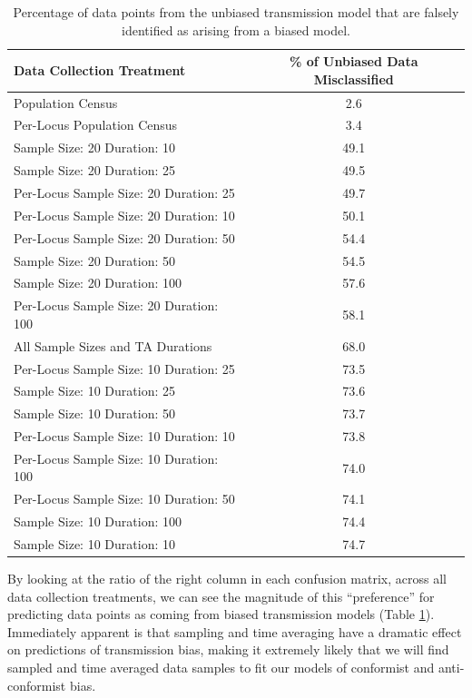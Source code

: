 \documentclass[10pt,letterpaper]{article}
\begin{document}
\begin{table}[ht]

\begin{tabular}{|l|c|}
  \hline
Data Collection Treatment & \% of Unbiased Data Misclassified \\
  \hline
Population Census & 2.6 \\
  Per-Locus Population Census & 3.4 \\
  Sample Size:  20  Duration:  10 & 49.1 \\
  Sample Size:  20  Duration:  25 & 49.5 \\
  Per-Locus Sample Size:  20  Duration:  25 & 49.7 \\
  Per-Locus Sample Size:  20  Duration:  10 & 50.1 \\
  Per-Locus Sample Size:  20  Duration:  50 & 54.4 \\
  Sample Size:  20  Duration:  50 & 54.5 \\
  Sample Size:  20  Duration:  100 & 57.6 \\
  Per-Locus Sample Size:  20  Duration:  100 & 58.1 \\
  All Sample Sizes and TA Durations & 68.0 \\
  Per-Locus Sample Size:  10  Duration:  25 & 73.5 \\
  Sample Size:  10  Duration:  25 & 73.6 \\
  Sample Size:  10  Duration:  50 & 73.7 \\
  Per-Locus Sample Size:  10  Duration:  10 & 73.8 \\
  Per-Locus Sample Size:  10  Duration:  100 & 74.0 \\
  Per-Locus Sample Size:  10  Duration:  50 & 74.1 \\
  Sample Size:  10  Duration:  100 & 74.4 \\
  Sample Size:  10  Duration:  10 & 74.7 \\
   \hline
\end{tabular}

    \caption{Percentage of data points from the unbiased transmission model that are falsely identified as arising from a biased model.}
    \label{tab:misclassification-neutral}
\end{table}

By looking at the ratio of the right column in each confusion matrix, across all data collection treatments, we can see the magnitude of this ``preference'' for predicting data points as coming from biased transmission models (Table \ref{tab:misclassification-neutral}).  Immediately apparent is that sampling and time averaging have a dramatic effect on predictions of transmission bias, making it extremely likely that we will find sampled and time averaged data samples to fit our models of conformist and anti-conformist bias.  
\end{document}
